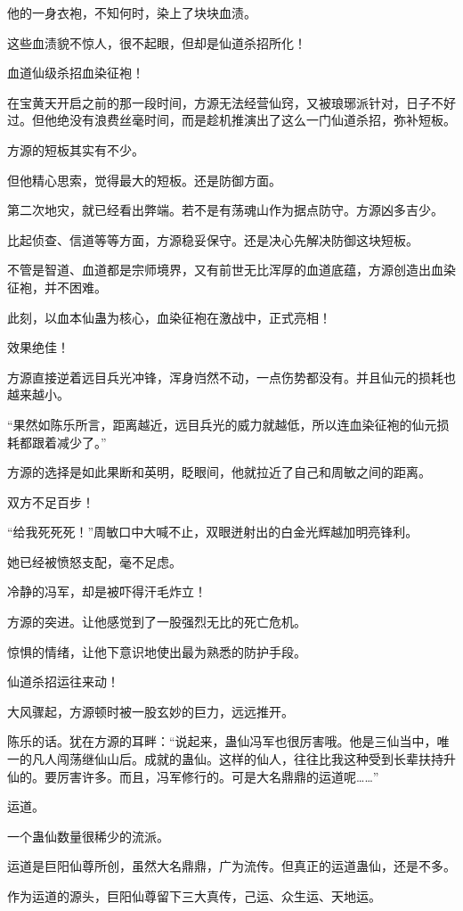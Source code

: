 \begin{this_body}
他的一身衣袍，不知何时，染上了块块血渍。

这些血渍貌不惊人，很不起眼，但却是仙道杀招所化！

血道仙级杀招血染征袍！

在宝黄天开启之前的那一段时间，方源无法经营仙窍，又被琅琊派针对，日子不好过。但他绝没有浪费丝毫时间，而是趁机推演出了这么一门仙道杀招，弥补短板。

方源的短板其实有不少。

但他精心思索，觉得最大的短板。还是防御方面。

第二次地灾，就已经看出弊端。若不是有荡魂山作为据点防守。方源凶多吉少。

比起侦查、信道等等方面，方源稳妥保守。还是决心先解决防御这块短板。

不管是智道、血道都是宗师境界，又有前世无比浑厚的血道底蕴，方源创造出血染征袍，并不困难。

此刻，以血本仙蛊为核心，血染征袍在激战中，正式亮相！

效果绝佳！

方源直接逆着远目兵光冲锋，浑身岿然不动，一点伤势都没有。并且仙元的损耗也越来越小。

“果然如陈乐所言，距离越近，远目兵光的威力就越低，所以连血染征袍的仙元损耗都跟着减少了。”

方源的选择是如此果断和英明，眨眼间，他就拉近了自己和周敏之间的距离。

双方不足百步！

“给我死死死！”周敏口中大喊不止，双眼迸射出的白金光辉越加明亮锋利。

她已经被愤怒支配，毫不足虑。

冷静的冯军，却是被吓得汗毛炸立！

方源的突进。让他感觉到了一股强烈无比的死亡危机。

惊惧的情绪，让他下意识地使出最为熟悉的防护手段。

仙道杀招运往来动！

大风骤起，方源顿时被一股玄妙的巨力，远远推开。

陈乐的话。犹在方源的耳畔：“说起来，蛊仙冯军也很厉害哦。他是三仙当中，唯一的凡人闯荡继仙山后。成就的蛊仙。这样的仙人，往往比我这种受到长辈扶持升仙的。要厉害许多。而且，冯军修行的。可是大名鼎鼎的运道呢……”

运道。

一个蛊仙数量很稀少的流派。

运道是巨阳仙尊所创，虽然大名鼎鼎，广为流传。但真正的运道蛊仙，还是不多。

作为运道的源头，巨阳仙尊留下三大真传，己运、众生运、天地运。


\end{this_body}
